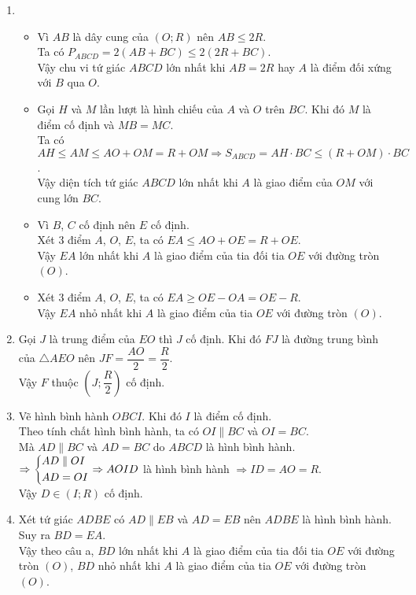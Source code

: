 \begin{bt}
{		\begin{enumerate}
			\item \begin{itemize}
				\item Vì $AB$ là dây cung của $(O;R)$ nên $AB\le 2R$.\\
				Ta có $P_{ABCD}=2(AB+BC)\le 2(2R+BC)$.\\
				Vậy chu vi tứ giác $ABCD$ lớn nhất khi $AB=2R$ hay $A$ là điểm đối xứng với $B$ qua $O$.
				\item Gọi $H$ và $M$ lần lượt là hình chiếu của $A$ và $O$ trên $BC$. Khi đó $M$ là điểm cố định và $MB=MC$.\\
				Ta có $AH\le AM\le AO+OM=R+OM\Rightarrow S_{ABCD}=AH\cdot BC\le (R+OM)\cdot BC$.\\
				Vậy diện tích tứ giác $ABCD$ lớn nhất khi $A$ là giao điểm của $OM$ với cung lớn $BC$.
				\item Vì $B$, $C$ cố định nên $E$ cố định.\\
				Xét $3$ điểm $A$, $O$, $E$, ta có $EA\le AO+OE=R+OE$.\\
				Vậy $EA$ lớn nhất khi $A$ là giao điểm của tia đối tia $OE$ với đường tròn $(O)$.
				\item Xét $3$ điểm $A$, $O$, $E$, ta có $EA\ge OE-OA=OE-R$.\\
				Vậy $EA$ nhỏ nhất khi $A$ là giao điểm của tia $OE$ với đường tròn $(O)$.
			\end{itemize}
			\item Gọi $J$ là trung điểm của $EO$ thì $J$ cố định. Khi đó $FJ$ là đường trung bình của $\triangle AEO$ nên $JF=\dfrac{AO}{2}=\dfrac{R}{2}$.\\
			Vậy $F$ thuộc $\left( J;\dfrac{R}{2}\right)$ cố định.
			\item Vẽ hình bình hành $OBCI$. Khi đó $I$ là điểm cố định.\\
			Theo tính chất hình bình hành, ta có $OI\parallel BC$ và $OI=BC$.\\
			Mà $AD\parallel BC$ và $AD=BC$ do $ABCD$ là hình bình hành.\\
			$\Rightarrow \left\{\begin{aligned}& AD \parallel OI\\ & AD=OI\end{aligned}\right.\Rightarrow AOID$ là hình bình hành $\Rightarrow ID=AO=R$.\\
			Vậy $D\in (I;R)$ cố định.
			\item Xét tứ giác $ADBE$ có $AD\parallel EB$ và $AD=EB$ nên $ADBE$ là hình bình hành. Suy ra $BD=EA$.\\
			Vậy theo câu a, $BD$ lớn nhất khi $A$ là giao điểm của tia đối tia $OE$ với đường tròn $(O)$, $BD$ nhỏ nhất khi $A$ là giao điểm của tia $OE$ với đường tròn $(O)$.

\end{enumerate}}
\end{bt}
